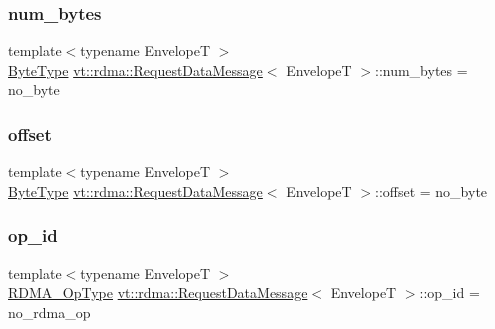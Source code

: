 \mbox{\label{structvt_1_1rdma_1_1_request_data_message_a7233a1b126b80aa06946ed15fad9d1b9}} 
\subsubsection{\texorpdfstring{num\+\_\+bytes}{num\_bytes}}
{\footnotesize\ttfamily template$<$typename EnvelopeT $>$ \\
\hyperlink{namespacevt_aab8d55968084610ce3b17057981e9300}{Byte\+Type} \hyperlink{structvt_1_1rdma_1_1_request_data_message}{vt\+::rdma\+::\+Request\+Data\+Message}$<$ EnvelopeT $>$\+::num\+\_\+bytes = no\+\_\+byte}

\mbox{\label{structvt_1_1rdma_1_1_request_data_message_abe76ac0fa80365f6e3d64232e7e5ff8b}} 
\subsubsection{\texorpdfstring{offset}{offset}}
{\footnotesize\ttfamily template$<$typename EnvelopeT $>$ \\
\hyperlink{namespacevt_aab8d55968084610ce3b17057981e9300}{Byte\+Type} \hyperlink{structvt_1_1rdma_1_1_request_data_message}{vt\+::rdma\+::\+Request\+Data\+Message}$<$ EnvelopeT $>$\+::offset = no\+\_\+byte}

\mbox{\label{structvt_1_1rdma_1_1_request_data_message_a622409576bf44670a1203992929c9869}} 
\subsubsection{\texorpdfstring{op\+\_\+id}{op\_id}}
{\footnotesize\ttfamily template$<$typename EnvelopeT $>$ \\
\hyperlink{namespacevt_1_1rdma_a9b966d9780a2b41afe7cd7b7b4b20300}{R\+D\+M\+A\+\_\+\+Op\+Type} \hyperlink{structvt_1_1rdma_1_1_request_data_message}{vt\+::rdma\+::\+Request\+Data\+Message}$<$ EnvelopeT $>$\+::op\+\_\+id = no\+\_\+rdma\+\_\+op}

